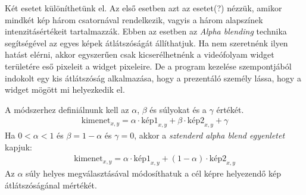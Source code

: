 Két esetet különíthetünk el. Az első esetben azt az esetet(?) nézzük, amikor mindkét kép három csatornával rendelkezik, vagyis a három alapszínek intenzitásértékeit tartalmazzák. Ebben az esetben az \textit{Alpha blending} technika segítségével az egyes képek átlátszóságát állíthatjuk. Ha nem szeretnénk ilyen hatást elérni, akkor egyszerűen csak kicserélhetnénk a videófolyam widget területére eső pixeleit a widget pixeleire. De a program kezelése szempontjából indokolt egy kis átlátszóság alkalmazása, hogy a prezentáló személy lássa, hogy a widget mögött mi helyezkedik el.

A módszerhez definiálnunk kell az $\alpha$, $\beta$ és súlyokat és a $\gamma$ értékét.
\begin{align*}
	\text{kimenet}_{x,y} = \alpha \cdot \text{kép1}_{x,y} + \beta \cdot \text{kép2}_{x,y} + \gamma
\end{align*}
Ha $0<\alpha<1$ és $\beta = 1 - \alpha$ és $\gamma = 0$, akkor a \textit{sztenderd alpha blend egyenletet}\cite{bradski2008learning} kapjuk:
\begin{align*}
		\text{kimenet}_{x,y} = \alpha \cdot \text{kép1}_{x,y} + (1-\alpha) \cdot \text{kép2}_{x,y}
\end{align*}
Az $\alpha$ súly helyes megválasztásával módosíthatuk a cél képre helyezendő kép átlátszóságánal mértékét.

